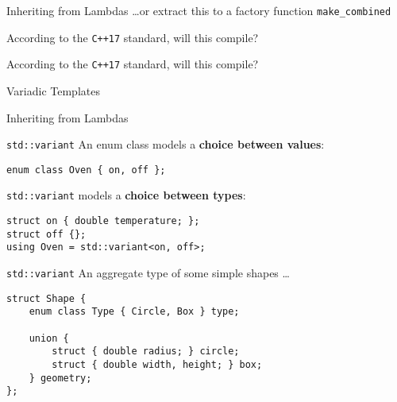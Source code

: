 \begin{frame}[fragile]{Inheriting from Lambdas}
    \ldots or extract this to a factory function \texttt{make\_combined}

\end{frame}

\begin{frame}[fragile]{According to the \texttt{C++17} standard, will this compile?}

\end{frame}

\begin{frame}[fragile]{According to the \texttt{C++17} standard, will this compile?}
\end{frame}

\begin{frame}[fragile]{Variadic Templates}
\end{frame}

\begin{frame}[noframenumbering]{Inheriting from Lambdas}
    \centering
    \scalebox{4.}{Why?}
\end{frame}

\begin{frame}
    \centering
    \scalebox{8.}{\{}
\end{frame}

\begin{frame}[fragile]{\texttt{std::variant}}
    An enum class models a \textbf{choice between \textcolor{vertexDarkRed}{values}}:
    \begin{lstlisting}
enum class Oven { on, off };
    \end{lstlisting}

    \texttt{std::variant} models a \textbf{choice between \textcolor{vertexDarkRed}{types}}:
    \begin{lstlisting}
struct on { double temperature; };
struct off {};
using Oven = std::variant<on, off>;
    \end{lstlisting}
\end{frame}

\begin{frame}[fragile]{\texttt{std::variant}}
    An aggregate type of some simple shapes \ldots
    \begin{lstlisting}
struct Shape {
    enum class Type { Circle, Box } type;
    
    union {
        struct { double radius; } circle;
        struct { double width, height; } box;
    } geometry;
};
    \end{lstlisting}
\end{frame}

